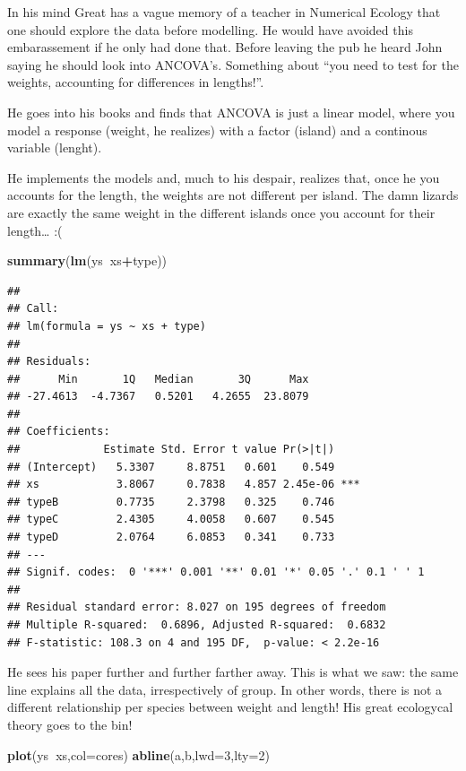\documentclass[
]{book}
\newenvironment{Shaded}{\begin{snugshade}}{\end{snugshade}}
\newcommand{\DataTypeTok}[1]{\textcolor[rgb]{0.13,0.29,0.53}{#1}}
\newcommand{\DecValTok}[1]{\textcolor[rgb]{0.00,0.00,0.81}{#1}}
\newcommand{\KeywordTok}[1]{\textcolor[rgb]{0.13,0.29,0.53}{\textbf{#1}}}
\newcommand{\NormalTok}[1]{#1}
\newcommand{\OperatorTok}[1]{\textcolor[rgb]{0.81,0.36,0.00}{\textbf{#1}}}
\begin{document}
In his mind Great has a vague memory of a teacher in Numerical Ecology that one should explore the data before modelling. He would have avoided this embarassement if he only had done that. Before leaving the pub he heard John saying he should look into ANCOVA's. Something about ``you need to test for the weights, accounting for differences in lengths!''.

He goes into his books and finds that ANCOVA is just a linear model, where you model a response (weight, he realizes) with a factor (island) and a continous variable (lenght).

He implements the models and, much to his despair, realizes that, once he you accounts for the length, the weights are not different per island. The damn lizards are exactly the same weight in the different islands once you account for their length\ldots{} :(

\begin{Shaded}
\begin{Highlighting}[]
\KeywordTok{summary}\NormalTok{(}\KeywordTok{lm}\NormalTok{(ys}\OperatorTok{~}\NormalTok{xs}\OperatorTok{+}\NormalTok{type))}
\end{Highlighting}
\end{Shaded}

\begin{verbatim}
## 
## Call:
## lm(formula = ys ~ xs + type)
## 
## Residuals:
##      Min       1Q   Median       3Q      Max 
## -27.4613  -4.7367   0.5201   4.2655  23.8079 
## 
## Coefficients:
##             Estimate Std. Error t value Pr(>|t|)    
## (Intercept)   5.3307     8.8751   0.601    0.549    
## xs            3.8067     0.7838   4.857 2.45e-06 ***
## typeB         0.7735     2.3798   0.325    0.746    
## typeC         2.4305     4.0058   0.607    0.545    
## typeD         2.0764     6.0853   0.341    0.733    
## ---
## Signif. codes:  0 '***' 0.001 '**' 0.01 '*' 0.05 '.' 0.1 ' ' 1
## 
## Residual standard error: 8.027 on 195 degrees of freedom
## Multiple R-squared:  0.6896,	Adjusted R-squared:  0.6832 
## F-statistic: 108.3 on 4 and 195 DF,  p-value: < 2.2e-16
\end{verbatim}

He sees his paper further and further farther away. This is what we saw: the same line explains all the data, irrespectively of group. In other words, there is not a different relationship per species between weight and length! His great ecologycal theory goes to the bin!

\begin{Shaded}
\begin{Highlighting}[]
\KeywordTok{plot}\NormalTok{(ys}\OperatorTok{~}\NormalTok{xs,}\DataTypeTok{col=}\NormalTok{cores)}
\KeywordTok{abline}\NormalTok{(a,b,}\DataTypeTok{lwd=}\DecValTok{3}\NormalTok{,}\DataTypeTok{lty=}\DecValTok{2}\NormalTok{)}
\end{Highlighting}
\end{Shaded}
\end{document}
